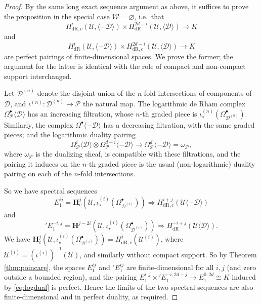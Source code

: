 \documentclass[cjm]{ipart}
\theoremstyle{plain}
\theoremstyle{remark}
\newcommand{\HH}{\mathbf{H}}
\newcommand{\cD}{\mathcal{D}}
\newcommand{\cP}{\mathcal{P}}
\newcommand{\cU}{\mathcal{U}}
\newcommand{\cW}{\mathcal{W}}
\newcommand{\dR}{\mathrm{dR}}
\numberwithin{equation}{subsection}
\begin{document}
   \begin{proof}
    By the same long exact sequence argument as above, it suffices to prove the proposition in the special case $\cW = \varnothing$, i.e.~that
    \[ H^i_{\dR, c}(\cU, \langle -\cD \rangle) \times H^{2d-i}_{\dR}(\cU, \langle \cD \rangle) \to K\]
    and
    \[ H^i_{\dR}(\cU, \langle -\cD \rangle) \times H^{2d-i}_{\dR, c}(\cU, \langle \cD \rangle) \to K\]
    are perfect pairings of finite-dimensional spaces. We prove the former; the argument for the latter is identical with the role of compact and non-compact support interchanged.

    Let $\cD^{(n)}$ denote the disjoint union of the $n$-fold intersections of components of $\cD$, and $\iota^{(n)}: \cD^{(n)} \to \cP$ the natural map. The logarithmic de Rham complex $\Omega^\bullet_{\cP}\langle \cD\rangle$ has an increasing filtration, whose $n$-th graded piece is $\iota^{(n)}_\star\left( \Omega^\bullet_{\cD^{(n)}}\right)$. Similarly, the complex $\Omega^\bullet\langle -\cD\rangle$ has a decreasing filtration, with the same graded pieces; and the logarithmic duality pairing
    \begin{equation}
     \label{eq:logdual}
     \Omega^i_{\cP}\langle \cD\rangle \otimes \Omega^{d-i}_{\cP}\langle -\cD\rangle \to \Omega^d_{\cP}\langle -\cD\rangle = \omega_{\cP},
    \end{equation}
    where $\omega_{\cP}$ is the dualizing sheaf, is compatible with these filtrations, and the pairing it induces on the $n$-th graded piece is the usual (non-logarithmic) duality pairing on each of the $n$-fold intersections.

    So we have spectral sequences
    \[ E_1^{ij} = \HH^j_c\left(\cU, \iota^{(i)}_\star\left( \Omega^\bullet_{\cD^{(i)}}\right)\right) \Rightarrow H^{i+j}_{\dR, c}\left(\cU\langle -\cD\rangle\right) \]
    and
    \[ 'E_1^{-i,j} = \HH^{j-2i}\left(\cU, \iota^{(i)}_\star\left( \Omega^\bullet_{\cD^{(i)}}\right)\right) \Rightarrow H^{-i+j}_{\dR}\left(\cU\langle \cD\rangle\right).
    \]
    We have $\HH^j_c\left(\cU, \iota^{(i)}_\star\left( \Omega^\bullet_{\cD^{(i)}}\right)\right) = H^j_{\dR, c}\left(\cU^{(i)}\right)$, where $\cU^{(i)} = (\iota^{(i)})^{-1}(\cU)$, and similarly without compact support. So by Theorem \ref{thm:poincare}, the spaces $E_1^{ij}$ and $'E_1^{ij}$ are finite-dimensional for all $i, j$ (and zero outside a bounded region), and the pairing $E_1^{i, j} \times {}'E_1^{-i, 2d-j} \to E_1^{0, 2d} \cong K$ induced by \eqref{eq:logdual} is perfect. Hence the limits of the two spectral sequences are also finite-dimensional and in perfect duality, as required.
   \end{proof}
\end{document}
